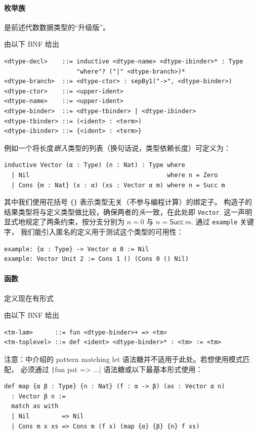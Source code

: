 \paragraph{枚举族} 是前述代数数据类型的“升级版”。
\begin{definition}[枚举族声明] 由以下 BNF 给出
\begin{verbatim}
<dtype-decl>    ::= inductive <dtype-name> <dtype-ibinder>* : Type
                    "where"? ("|" <dtype-branch>)*
<dtype-branch>  ::= <dtype-ctor> : sepBy1("->", <dtype-binder>)
<dtype-ctor>    ::= <upper-ident>
<dtype-name>    ::= <upper-ident>
<dtype-binder>  ::= <dtype-tbinder> | <dtype-ibinder>
<dtype-tbinder> ::= (<ident> : <term>)
<dtype-ibinder> ::= {<ident> : <term>}
\end{verbatim}
\end{definition}
例如一个将长度\emph{嵌入}类型的列表（换句话说，类型依赖长度）可定义为：
\begin{verbatim}
inductive Vector (α : Type) (n : Nat) : Type where
  | Nil                                      where n = Zero
  | Cons {m : Nat} (x : α) (xs : Vector α m) where n = Succ m
\end{verbatim}
其中我们使用花括号 \texttt{\{\}} 表示类型无关（不参与编程计算）的绑定子。
构造子的结果类型将与定义类型做比较，确保两者的\emph{头}一致，在此处即 \texttt{Vector}.
这一声明显式地规定了两条约束，按分支分别为 $n = 0$ 与 $n = \mathsf{Succ}\ m$. 通过 \texttt{example} 关键字，
我们能引入匿名的定义用于测试这个类型的可用性：
\begin{verbatim}
example: {α : Type} -> Vector α 0 := Nil
example: Vector Unit 2 := Cons 1 () (Cons 0 () Nil)
\end{verbatim}
\paragraph{函数} 定义现在有形式
\begin{definition}[函数定义] 由以下 BNF 给出
\begin{verbatim}
<tm-lam>      ::= fun <dtype-binder>+ => <tm>
<tm-toplevel> ::= def <ident> <dtype-binder>* : <tm> := <tm>
\end{verbatim}
\end{definition}
注意：\Tigris 中介绍的 pattern matching let 语法糖并不适用于此处。若想使用模式匹配，
必须通过 \texttt|fun pat => ...| 语法糖或以下最基本形式使用：
\begin{verbatim}
def map {α β : Type} {n : Nat} (f : α -> β) (as : Vector α n)
  : Vector β n :=
  match as with
  | Nil         => Nil
  | Cons m x xs => Cons m (f x) (map {α} {β} {n} f xs)
\end{verbatim}

